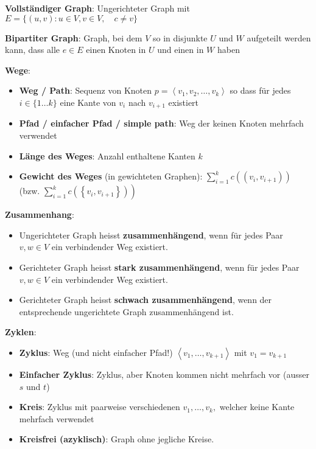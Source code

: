 \documentclass[german]{latex4ei/latex4ei_sheet}
\begin{document}
\begin{sectionbox}
\textbf{Vollständiger Graph}: Ungerichteter Graph mit  $E=\{(u, v): u \in V, v \in V, \quad c \neq v\}$\par\smallskip
\textbf{Bipartiter Graph}: Graph, bei dem $V$ so in disjunkte $U$ und $W$ aufgeteilt werden kann, dass alle $e \in E$ einen Knoten in $U$ und einen in $W$ haben\par
\textbf{Wege}:\par
\begin{itemize}
    \item \textbf{Weg / Path}: Sequenz von Knoten $p=\left\langle v_{1}, v_{2}, \ldots, v_{k}\right\rangle$ so dass für jedes $i \in\{1 \ldots k\}$ eine Kante von $v_{i}$ nach $v_{i+1}$ existiert
    \item \textbf{Pfad / einfacher Pfad / simple path}: Weg der keinen Knoten mehrfach verwendet
    \item \textbf{Länge des Weges}: Anzahl enthaltene Kanten $k$
    \item \textbf{Gewicht des Weges} (in gewichteten Graphen): $\sum_{i=1}^{k} c\left(\left(v_{i}, v_{i+1}\right)\right)$ (bzw. $\left.\sum_{i=1}^{k} c\left(\left\{v_{i}, v_{i+1}\right\}\right)\right)$
\end{itemize}\par\smallskip
\textbf{Zusammenhang}:\par
\begin{itemize}
    \item Ungerichteter Graph heisst \textbf{zusammenhängend}, wenn für jedes Paar $v, w \in V$ ein verbindender Weg existiert.
    \item Gerichteter Graph heisst \textbf{stark zusammenhängend}, wenn für jedes Paar $v, w \in V$ ein verbindender Weg existiert.
    \item Gerichteter Graph heisst \textbf{schwach zusammenhängend}, wenn der entsprechende ungerichtete Graph zusammenhängend ist.
\end{itemize}\par\smallskip
\textbf{Zyklen}:\par
\begin{itemize}
    \item \textbf{Zyklus}: Weg (und nicht einfacher Pfad!) $\left\langle v_{1}, \ldots, v_{k+1}\right\rangle$ mit $v_{1}=v_{k+1}$
    \item \textbf{Einfacher Zyklus}: Zyklus, aber Knoten kommen nicht mehrfach vor (ausser $s$ und $t$)
    \item \textbf{Kreis}: Zyklus mit paarweise verschiedenen $v_{1}, \ldots, v_{k},$ welcher keine Kante mehrfach verwendet
    \item \textbf{Kreisfrei (azyklisch)}: Graph ohne jegliche Kreise.
\end{itemize}\par\vspace{7px}


\end{sectionbox}
\end{document}
